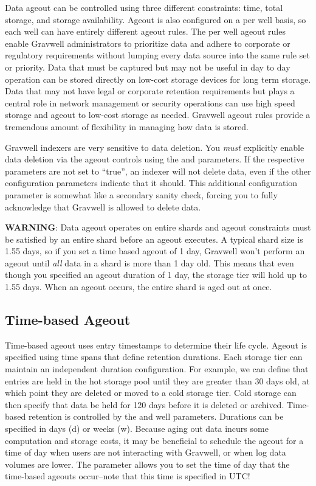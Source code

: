 {{Data ageout can be controlled using three different constraints: time,
total storage, and storage availability. Ageout is also configured on a
per well basis, so each well can have entirely different ageout rules.
The per well ageout rules enable Gravwell administrators to prioritize
data and adhere to corporate or regulatory requirements without lumping
every data source into the same rule set or priority. Data that must be
captured but may not be useful in day to day operation can be stored
directly on low-cost storage devices for long term storage. Data that
may not have legal or corporate retention requirements but plays a
central role in network management or security operations can use high
speed storage and ageout to low-cost storage as needed. Gravwell ageout
rules provide a tremendous amount of flexibility in managing how data is
stored.

Gravwell indexers are very sensitive to data deletion. You
\emph{must} explicitly enable data deletion via the ageout controls using
the  and  parameters. If the
respective parameters are not set to ``true'', an indexer will not
delete data, even if the other configuration parameters indicate that it
should. This additional configuration parameter is somewhat like a
secondary sanity check, forcing you to fully acknowledge that Gravwell
is allowed to delete data.

\textbf{WARNING}: Data ageout operates on entire shards and ageout constraints
must be satisfied by an entire shard before an ageout executes. A
typical shard size is 1.55 days, so if you set a time based ageout of 1
day, Gravwell won't perform an ageout until \emph{all} data in a shard is
more than 1 day old. This means that even though you specified an
ageout duration of 1 day, the storage tier will hold up to 1.55 days.
When an ageout occurs, the entire shard is aged out at once.

\subsection{Time-based Ageout}

Time-based ageout uses entry timestamps to determine their life cycle.
Ageout is specified using time spans that define retention durations.
Each storage tier can maintain an independent duration configuration.
For example, we can define that entries are held in the hot storage
pool until they are greater than 30 days old, at which point they are
deleted or moved to a cold storage tier. Cold storage can then specify
that data be held for 120 days before it is deleted or archived.
Time-based retention is controlled by the  and
 well parameters. Durations can be specified in days
(d) or weeks (w). Because aging out data incurs some computation and
storage costs, it may be beneficial to schedule the ageout for a time of
day when users are not interacting with Gravwell, or when log data
volumes are lower. The  parameter allows you to
set the time of day that the time-based ageouts occur--note that
this time is specified in UTC!

}}
